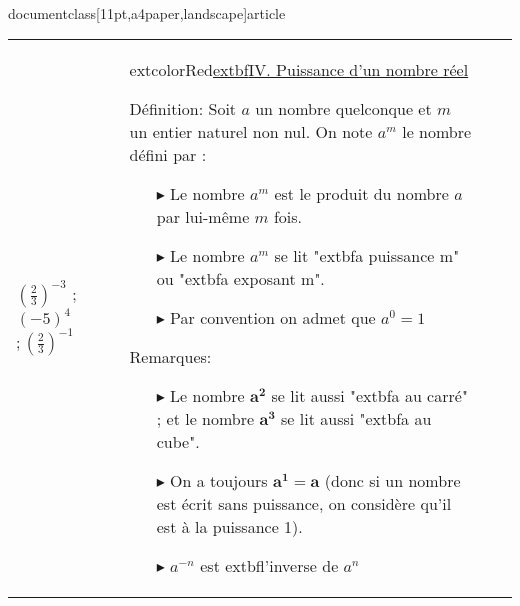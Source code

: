 \\documentclass[11pt,a4paper,landscape]{article}
\begin{document}
\begin{longtable}{|>{\centering\arraybackslash}p{3cm}|>{\raggedright\arraybackslash}p{5cm}|>{\raggedright\arraybackslash}p{13.5cm}|>{\raggedright\arraybackslash}p{5cm}|}
$\left ( \frac 23\right ) ^{- 3}$ ; $\left ( - 5\right ) ^4$ $; \left ( \frac 23\right ) ^{- 1}$
&	
extcolor{Red}{\uline{\sffamily extbf{IV. Puissance d’un nombre réel} }}\par
\begin{BoxRafa}[colbacktitle = green]{Définition:}
Soit $a$ un nombre quelconque et $m$ un entier naturel non nul. On note   $a^m$ le nombre défini par : %

\hspace*{3cm}\begin{tikzpicture}[
roundnode/.style={circle, draw=green!60, fill=green!5, very thick, minimum size=7mm},
squarednode/.style={rectangle, draw=red!60, fill=red!5, very thick, minimum size=5mm},
]
node[squarednode](maintopic){$a^m=\underbrace{aimes aimes\cdotsimes a}_{m\ fois}$};

\end{tikzpicture}\vspace{-.3cm}
\begin{itemize}
\item[$\blacktriangleright$]  Le nombre $a^m$ est le produit du nombre $a$ par lui-même $m$ fois.
\item[$\blacktriangleright$]  Le nombre $a^m$ se lit "extbf{a puissance m}" ou "extbf{a exposant m}".
\item[$\blacktriangleright$]  Par convention on admet que $a^0=1$
\end{itemize}
\end{BoxRafa}
\begin{BoxRafa}[colbacktitle = Orange]{Remarques:}

\begin{itemize}
\item[$\blacktriangleright$]  Le nombre $\mathbf{a^{2}}$ se lit aussi "extbf{a au carré}" ; et le nombre $\mathbf{a^{3}}$ se lit aussi "extbf{a au cube}".
\item[$\blacktriangleright$]  On a toujours $\mathbf{a^{1}=a}$ (donc si un nombre est écrit sans puissance, on considère qu’il est à la puissance 1).
\item[$\blacktriangleright$]  $a^{-n}$ est extbf{l’inverse} de $a^{n}$
\end{itemize}


\end{BoxRafa}
\end{longtable}
\end{document}
